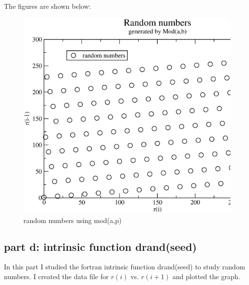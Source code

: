 \documentclass[11pt,a4paper,english]{article}
\begin{document}
	    The figures are shown below:\\
	\begin{figure}[h!]
	\centering
	\includegraphics [scale=0.6]{figures/hw8qn1c.eps}
	\caption{random numbers using mod(a,p) }
	\end{figure}
	\clearpage
	
	\subsection{part d: intrinsic function drand(seed) }
    In this part I studied the fortran intrinsic function drand(seed) to study
    random numbers. I created the data file for $r(i)$ vs. $r(i+1)$ and plotted
    the graph.\\
    
\end{document}

